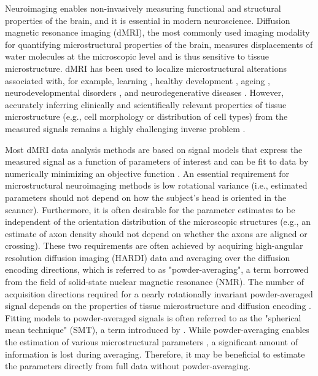 \documentclass[10pt, letterpaper, oneside]{article}
\begin{document}
Neuroimaging enables non-invasively measuring functional and structural properties of the brain, and it is essential in modern neuroscience. Diffusion magnetic resonance imaging (dMRI), the most commonly used imaging modality for quantifying microstructural properties of the brain, measures displacements of water molecules at the microscopic level and is thus sensitive to tissue microstructure. dMRI has been used to localize microstructural alterations associated with, for example, learning \citep{sagi2012learning}, healthy development \citep{lebel2019review}, ageing \citep{sullivan2006diffusion}, neurodevelopmental disorders \citep{gibbard2018structural}, and neurodegenerative diseases \citep{zhang2009white}. However, accurately inferring clinically and scientifically relevant properties of tissue microstructure (e.g., cell morphology or distribution of cell types) from the measured signals remains a highly challenging inverse problem \citep{kiselev2017fundamentals}.

Most dMRI data analysis methods are based on signal models that express the measured signal as a function of parameters of interest and can be fit to data by numerically minimizing an objective function \citep{novikov2019quantifying}. An essential requirement for microstructural neuroimaging methods is low rotational variance (i.e., estimated parameters should not depend on how the subject's head is oriented in the scanner). Furthermore, it is often desirable for the parameter estimates to be independent of the orientation distribution of the microscopic structures (e.g., an estimate of axon density should not depend on whether the axons are aligned or crossing). These two requirements are often achieved by acquiring high-angular resolution diffusion imaging (HARDI) data and averaging over the diffusion encoding directions, which is referred to as "powder-averaging", a term borrowed from the field of solid-state nuclear magnetic resonance (NMR). The number of acquisition directions required for a nearly rotationally invariant powder-averaged signal depends on the properties of tissue microstructure and diffusion encoding \citep{szczepankiewicz2019tensor}. Fitting models to powder-averaged signals is often referred to as the "spherical mean technique" (SMT), a term introduced by \cite{kaden2016quantitative}. While powder-averaging enables the estimation of various microstructural parameters \citep{jespersen2013orientationally, lasivc2014microanisotropy, kaden2016quantitative, kaden2016multi, szczepankiewicz2016link, henriques2020correlation, palombo2020sandi, gyori2021potential}, a significant amount of information is lost during averaging. Therefore, it may be beneficial to estimate the parameters directly from full data without powder-averaging.
\end{document}
